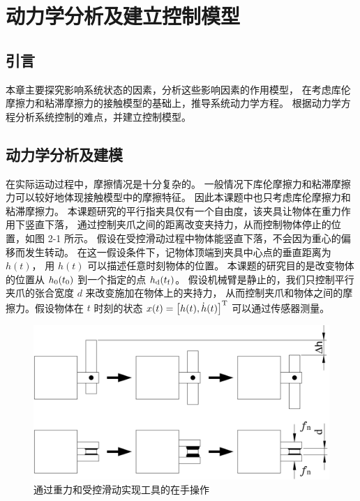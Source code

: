 \chapter{动力学分析及建立控制模型}

\section{引言}
本章主要探究影响系统状态的因素，分析这些影响因素的作用模型，
在考虑库伦摩擦力和粘滞摩擦力的接触模型的基础上，推导系统动力学方程。
根据动力学方程分析系统控制的难点，并建立控制模型。

\section{动力学分析及建模}

在实际运动过程中，摩擦情况是十分复杂的。
一般情况下库伦摩擦力和粘滞摩擦力可以较好地体现接触模型中的摩擦特征。
因此本课题中也只考虑库伦摩擦力和粘滞摩擦力。
本课题研究的平行指夹具仅有一个自由度，该夹具让物体在重力作用下竖直下落，
通过控制夹爪之间的距离改变夹持力，从而控制物体停止的位置，如图 2-1 所示。
假设在受控滑动过程中物体能竖直下落，不会因为重心的偏移而发生转动。
在这一假设条件下，记物体顶端到夹具中心点的垂直距离为$h(t)$，
用 $h(t)$ 可以描述任意时刻物体的位置。
本课题的研究目的是改变物体的位置从 ${h_{\rm 0}}({t_{\rm 0}})$ 到一个指定的点 ${h_{\rm d}}({t_{\rm f}})$。
假设机械臂是静止的，我们只控制平行夹爪的张合宽度 $d$ 来改变施加在物体上的夹持力，
从而控制夹爪和物体之间的摩擦力。假设物体在 $t$ 时刻的状态 $x(t) = {\left[ {h(t),\dot h(t)} \right]^{\rm T}}$ 可以通过传感器测量。

\begin{figure}[!ht]
  \centering
  \includegraphics[width=13cm]{chapter02/pic/2-1}
  \caption{通过重力和受控滑动实现工具的在手操作}
  \label{fig:2-1}
  \vspace{-0.3cm}
\end{figure}

